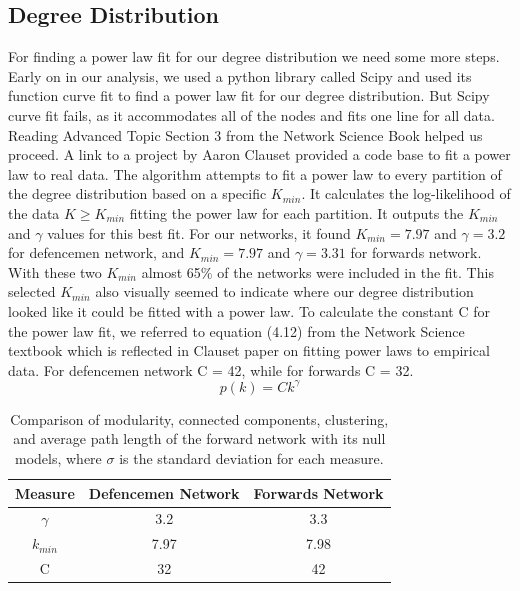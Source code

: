 \documentclass{article}
\begin{document}
\subsection{Degree Distribution}
For finding a power law fit for our degree distribution we need some more steps. Early on in our analysis, we used a python library called Scipy and used its function curve fit to find a power law fit for our degree distribution. But Scipy curve fit fails, as it accommodates all of the nodes and fits one line for all data. 
Reading Advanced Topic Section 3 from the Network Science Book helped us proceed. A link to a project by Aaron Clauset \cite{clauset2009power} provided a code base to fit a power law to real data. The algorithm attempts to fit a power law to every partition of the degree distribution based on a specific $K_{min}$. It calculates the log-likelihood of the data $K \geq K_{min}$ fitting the power law for each partition. It outputs the $K_{min}$ and $\gamma$ values for this best fit. 
For our networks, it found $K_{min} = 7.97$  and $\gamma = 3.2$ for defencemen network, and $K_{min} = 7.97$  and $\gamma = 3.31$ for forwards network.  With these two $K_{min}$ almost 65\% of the networks were included in the fit. This selected $K_{min}$ also visually seemed to indicate where our degree distribution looked like it could be fitted with a power law. 
To calculate the constant C for the power law fit, we referred to equation (4.12) from the Network Science textbook \cite{Barabasi} which is reflected in Clauset paper on fitting power laws to empirical data. For defencemen network C = 42, while for forwards C = 32.
\begin{equation}
p(k) = Ck^\gamma
\end{equation}

\begin{table}[H]
\centering %

\begin{tabular}{ccc}
\hline
Measure & Defencemen Network & Forwards Network\\
\hline
$\gamma$ &  3.2 & 3.3\\
$k_{min}$ & 7.97 & 7.98\\
C & 32 & 42\\
\hline
\end{tabular}
\caption{Comparison of modularity, connected components, clustering, and average path length of the forward network with its null models, where $\sigma$ is the standard deviation for each measure.}\label{tab3}
\end{table}
\end{document}
